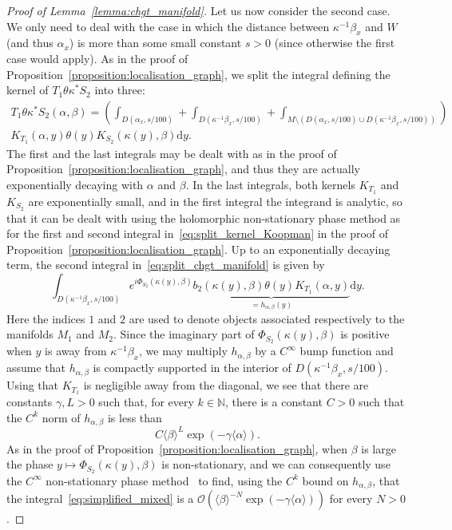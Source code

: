 \documentclass[10pt]{amsart}
\theoremstyle{definition}\newtheorem{defi}[theo]{Definition}\newtheorem{rema}[theo]{Remark}\newtheorem{exam}[theo]{Example}\newtheorem{exem}[theo]{Example}\newtheorem{nota}[theo]{Notation}
\newcommand{\p}[1]{\left(#1\right)}
\newcommand{\brac}[1]{\langle #1 \rangle}
\newcommand{\clO}{\mathcal{O}}
\newcommand{\bbN}{\mathbb{N}}
\newcommand{\rmd}{\mathrm{d}}
\begin{document}
\begin{proof}[Proof of Lemma~\ref{lemma:chgt_manifold}]
Let us now consider the second case. We only need to deal with the case in which the distance between $\kappa^{-1} \beta_x$ and $W$ (and thus $\alpha_x$) is more than some small constant $s > 0$ (since otherwise the first case would apply). As in the proof of Proposition~\ref{proposition:localisation_graph}, we split the integral defining the kernel of $T_1 \theta \kappa^* S_2$ into three:
\begin{multline}\label{eq:split_chgt_manifold}
 T_1 \theta \kappa^* S_2(\alpha,\beta)
 = \p{\int_{D(\alpha_x,s/100)} + \int_{D\left(\kappa^{-1} \beta_x,s/100\right)} + \int_{M \setminus \left(D(\alpha_x,s/100) \cup D\left(\kappa^{-1} \beta_x,s/100\right)\right)}} \\
K_{T_1}(\alpha,y) \theta(y) K_{S_2}(\kappa (y), \beta) \rmd y.
\end{multline}
The first and the last integrals may be dealt with as in the proof of Proposition~\ref{proposition:localisation_graph}, and thus they are actually exponentially decaying with $\alpha$ and $\beta$. In the last integrals, both kernels $K_{T_1}$ and $K_{S_2}$ are exponentially small, and in the first integral the integrand is analytic, so that it can be dealt with using the holomorphic non-stationary phase method as for the first and second integral in~\eqref{eq:split_kernel_Koopman} in the proof of Proposition~\ref{proposition:localisation_graph}. Up to an exponentially decaying term, the second integral in~\eqref{eq:split_chgt_manifold} is given by
\begin{equation}\label{eq:simplified_mixed}
\int_{D\left(\kappa^{-1} \beta_x,s/100\right)} e^{i \Phi_{S_2}(\kappa(y),\beta)} \underbrace{b_2(\kappa (y), \beta) \theta(y) K_{T_1}(\alpha,y)}_{= h_{\alpha,\beta}(y)} \rmd y.
\end{equation}
Here the indices $1$ and $2$ are used to denote objects associated respectively to the manifolds $M_1$ and $M_2$. Since the imaginary part of $\Phi_{S_2}(\kappa(y),\beta)$ is positive when $y$ is away from $\kappa^{-1}
\beta_x$, we may multiply $h_{\alpha,\beta}$ by a $C^\infty$ bump function and assume that $h_{\alpha,\beta}$ is compactly supported in the interior of $D(\kappa^{-1} \beta_x,s/100)$. Using that $K_{T_1}$ is negligible away from the diagonal, we see that there are constants $\gamma,L > 0$ such that, for every $k \in \bbN$, there is a constant $C > 0$ such that the $C^k$ norm of $h_{\alpha,\beta}$ is less than
\begin{equation*}
C \brac{\beta}^L \exp\p{ - \gamma \brac{\alpha}}.
\end{equation*}
As in the proof of Proposition~\ref{proposition:localisation_graph}, when $\beta$ is large the phase $y\mapsto \Phi_{S_2}(\kappa (y), \beta)$ is non-stationary, and we can consequently use the $C^\infty$ non-stationary phase method~\cite[Theorem~7.7.1]{hormander_book_1} to find, using the $C^k$ bound on $h_{\alpha,\beta}$, that the integral~\eqref{eq:simplified_mixed} is a $\clO\p{\brac{\beta}^{-N} \exp\p{- \gamma \brac{\alpha}}}$ for every $N > 0$.


\end{proof}
\end{document}
